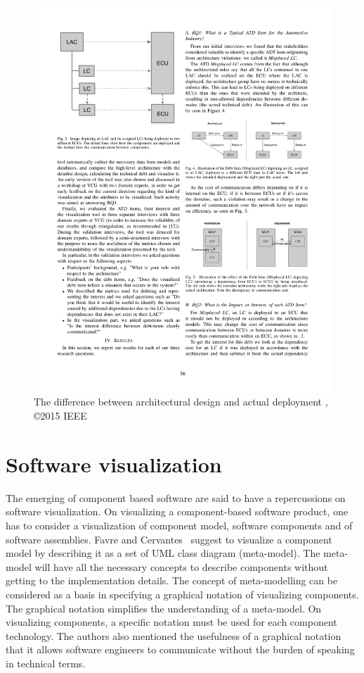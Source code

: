 \begin{figure}[H]
\centering
\captionsetup{justification=centering}
\vspace{0cm}%
\includegraphics[width=0.7\linewidth]{figure/literatures/eliasson_atd.pdf}
\caption{The difference between architectural design and actual deployment \cite{Eliasson_2}, \copyright2015 IEEE}
\label{fig:eliasson_atd}
\end{figure}

\section{Software visualization}
The emerging of component based software are said to have a repercussions on software visualization. On visualizing a component-based software product, one has to consider a visualization of  component model, software components and of software assemblies. Favre and Cervantes~\cite{Jean} suggest to visualize a component model by describing it as a set of UML class diagram (meta-model). The meta-model will have all the necessary concepts to describe components without getting to the implementation details. The concept of meta-modelling can be considered as a basis in specifying a graphical notation of visualizing components. The graphical notation simplifies the understanding of a meta-model. On visualizing components, a specific notation must be used for each component technology. The authors also mentioned the usefulness of a graphical notation that it allows software engineers to communicate without the burden of speaking in technical terms.\\

